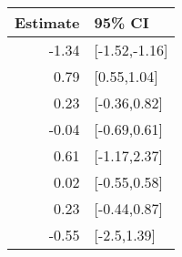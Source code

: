 \begin{tabular}{rl}
  \hline
Estimate & 95\% CI \\ 
  \hline
-1.34 & [-1.52,-1.16] \\ 
  0.79 & [0.55,1.04] \\ 
  0.23 & [-0.36,0.82] \\ 
  -0.04 & [-0.69,0.61] \\ 
  0.61 & [-1.17,2.37] \\ 
  0.02 & [-0.55,0.58] \\ 
  0.23 & [-0.44,0.87] \\ 
  -0.55 & [-2.5,1.39] \\ 
   \hline
\end{tabular}

